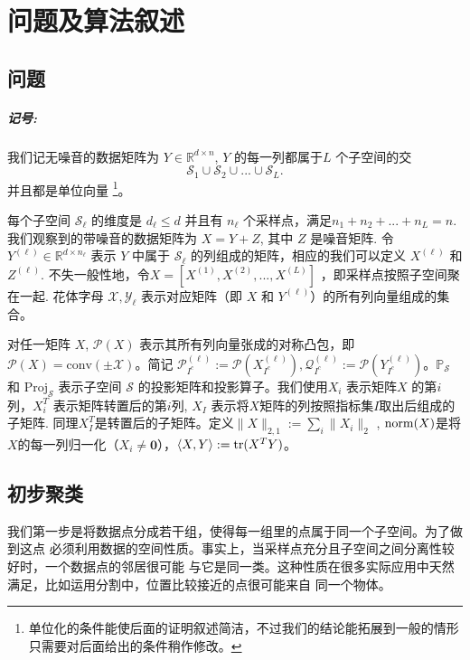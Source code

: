 \documentclass[main]{subfiles}
\begin{document}
\chapter{问题及算法叙述}\label{chp:prob_setup}
\section{问题}
\paragraph{记号: }
我们记无噪音的数据矩阵为 $Y \in \mathbb{R}^{d\times n}$,  $Y$ 的每一列都属于$L$
个子空间的交
$$\mathcal{S}_1 \cup \mathcal{S}_2 \cup...\cup \mathcal{S}_L.$$
并且都是单位向量
\footnote{单位化的条件能使后面的证明叙述简洁，不过我们的结论能拓展到一般的情形只需要对后面给出的条件稍作修改。}。

每个子空间 $\mathcal{S}_{\ell}$ 的维度是 $d_{\ell} \le d$ 并且有 $n_{\ell}$
个采样点，满足$n_1 +n_2+...+n_L=n$. 我们观察到的带噪音的数据矩阵为 $X = Y+Z$,
其中 $Z$ 是噪音矩阵. 令 $Y^{(\ell)}\in \mathbb{R}^{d\times n_{\ell}}$ 表示 
$Y$ 中属于 $\mathcal{S}_{\ell}$ 的列组成的矩阵，相应的我们可以定义 $X^{(\ell)}$ 和 $Z^{(\ell)}$.
不失一般性地，令$X=[X^{(1)},X^{(2)},...,X^{(L)}]$ ，即采样点按照子空间聚在一起.
花体字母 $\mathcal{X},\mathcal{Y_{\ell}}$ 表示对应矩阵（即 $X$ 和 $Y^{(\ell)}$）的所有列向量组成的集合。

对任一矩阵 $X$, $\mathcal{P}(X)$ 表示其所有列向量张成的对称凸包，即
$\mathcal{P}(X) = \mathrm{conv}(\pm \mathcal{X})$。简记
$\mathcal{P}_{I^c}^{(\ell)} := \mathcal{P}(X_{I^c}^{(\ell)}), \mathcal{Q}_{I^c}^{(\ell)} :=
\mathcal{P}(Y_{I^c}^{(\ell)})$。$\mathbb{P}_{\mathcal{S}}$ 和
$\mathrm{Proj}_{\mathcal{S}}$ 表示子空间 $\mathcal{S}$
的投影矩阵和投影算子。我们使用$X_i$ 表示矩阵$X$ 的第$i$列，$X_i^T$ 表示矩阵转置后的第$i$列, $X_I$
表示将$X$矩阵的列按照指标集$I$取出后组成的子矩阵.
同理$X^T_I$是转置后的子矩阵。定义$\|X\|_{2, 1}:= \sum_i \|X_i\|_2$ ,
$\mathrm{norm}(X)$是将$X$的每一列归一化（$X_i \neq \mathbf{0}$），$\langle X, Y \rangle
:= \mathrm{tr}(X^T Y)$。

\section{初步聚类}
我们第一步是将数据点分成若干组，使得每一组里的点属于同一个子空间。为了做到这点
必须利用数据的空间性质。事实上，当采样点充分且子空间之间分离性较好时，一个数据点的邻居很可能
与它是同一类。这种性质在很多实际应用中天然满足，比如运用分割中，位置比较接近的点很可能来自
同一个物体。
\end{document}
